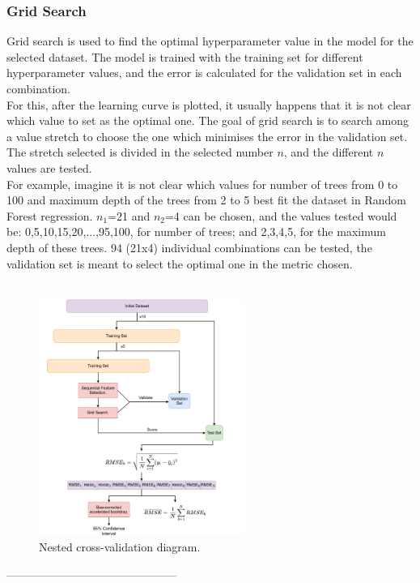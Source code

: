 \subsubsection{Grid Search}
Grid search is used to find the optimal hyperparameter value in the model for the selected dataset. The model is trained with the training set for different hyperparameter values, and the error is calculated for the validation set in each combination.\\

For this, after the learning curve is plotted, it usually happens that it is not clear which value to set as the optimal one. The goal of grid search is to search among a value stretch to choose the one which minimises the error in the validation set. The stretch selected is divided in the selected number $n$, and the different $n$ values are tested.\\

For example, imagine it is not clear which values for number of trees from 0 to 100 and maximum depth of the trees from 2 to 5 best fit the dataset in Random Forest regression.
$n_1$=21 and $n_2$=4 can be chosen, and the values tested would be: 0,5,10,15,20,...,95,100, for number of trees; and 2,3,4,5, for the maximum depth of these trees.
94 (21x4) individual combinations can be tested, the validation set is meant to select the optimal one in the metric chosen.\\\\
\begin{figure}
\begin{center}
\vspace{-1.7cm}
\includegraphics[width=0.6\textwidth]{Images/Methods/CV/Nested CV.png}
\caption{\centering Nested cross-validation diagram.}
\vspace{-1cm}
\end{center}
\end{figure}
---------------------------------------------\\


